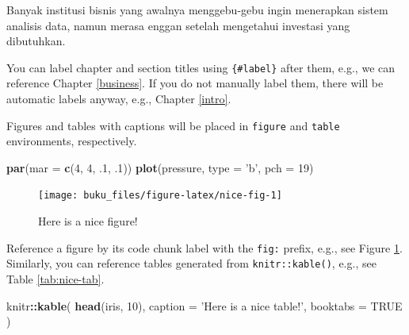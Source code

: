 \documentclass[]{book}
\newenvironment{Shaded}{\begin{snugshade}}{\end{snugshade}}
\newcommand{\DataTypeTok}[1]{\textcolor[rgb]{0.13,0.29,0.53}{#1}}
\newcommand{\DecValTok}[1]{\textcolor[rgb]{0.00,0.00,0.81}{#1}}
\newcommand{\FloatTok}[1]{\textcolor[rgb]{0.00,0.00,0.81}{#1}}
\newcommand{\KeywordTok}[1]{\textcolor[rgb]{0.13,0.29,0.53}{\textbf{#1}}}
\newcommand{\NormalTok}[1]{#1}
\newcommand{\OperatorTok}[1]{\textcolor[rgb]{0.81,0.36,0.00}{\textbf{#1}}}
\newcommand{\OtherTok}[1]{\textcolor[rgb]{0.56,0.35,0.01}{#1}}
\newcommand{\StringTok}[1]{\textcolor[rgb]{0.31,0.60,0.02}{#1}}
\begin{document}
Banyak institusi bisnis yang awalnya menggebu-gebu ingin menerapkan sistem analisis data, namun merasa enggan setelah mengetahui investasi yang dibutuhkan.

You can label chapter and section titles using \texttt{\{\#label\}} after them, e.g., we can reference Chapter \ref{business}. If you do not manually label them, there will be automatic labels anyway, e.g., Chapter \ref{intro}.

Figures and tables with captions will be placed in \texttt{figure} and \texttt{table} environments, respectively.

\begin{Shaded}
\begin{Highlighting}[]
\KeywordTok{par}\NormalTok{(}\DataTypeTok{mar =} \KeywordTok{c}\NormalTok{(}\DecValTok{4}\NormalTok{, }\DecValTok{4}\NormalTok{, }\FloatTok{.1}\NormalTok{, }\FloatTok{.1}\NormalTok{))}
\KeywordTok{plot}\NormalTok{(pressure, }\DataTypeTok{type =} \StringTok{'b'}\NormalTok{, }\DataTypeTok{pch =} \DecValTok{19}\NormalTok{)}
\end{Highlighting}
\end{Shaded}

\begin{figure}

{\centering \texttt{[image: buku\_files/figure-latex/nice-fig-1]} 

}

\caption{Here is a nice figure!}\label{fig:nice-fig}
\end{figure}

Reference a figure by its code chunk label with the \texttt{fig:} prefix, e.g., see Figure \ref{fig:nice-fig}. Similarly, you can reference tables generated from \texttt{knitr::kable()}, e.g., see Table \ref{tab:nice-tab}.

\begin{Shaded}
\begin{Highlighting}[]
\NormalTok{knitr}\OperatorTok{::}\KeywordTok{kable}\NormalTok{(}
  \KeywordTok{head}\NormalTok{(iris, }\DecValTok{10}\NormalTok{), }\DataTypeTok{caption =} \StringTok{'Here is a nice table!'}\NormalTok{,}
  \DataTypeTok{booktabs =} \OtherTok{TRUE}
\NormalTok{)}
\end{Highlighting}
\end{Shaded}
\end{document}

